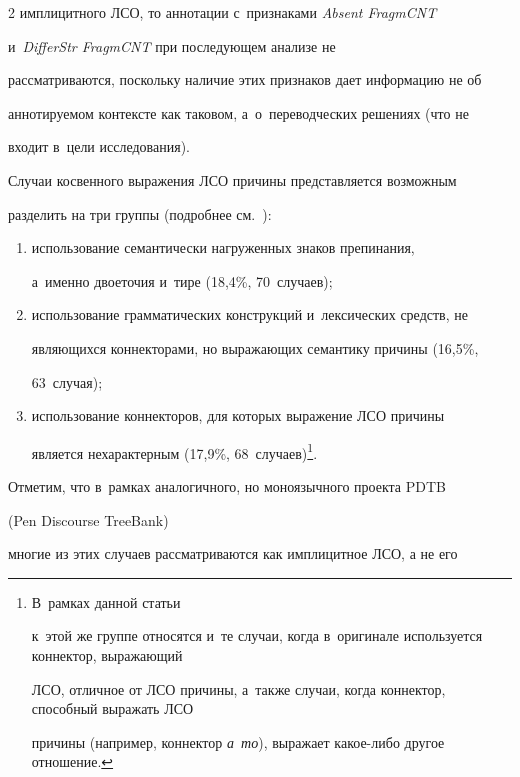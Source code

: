 \begin{multicols}{2}
имплицитного ЛСО, то аннотации с~признаками \textit{Absent FragmCNT} 


и~\textit{DifferStr \mbox{FragmCNT}} при последующем анализе не 


рассматриваются, поскольку наличие этих признаков дает информацию не об 


аннотируемом контексте как таковом, а~о~переводческих решениях (что не 


входит в~цели исследования).


   


   Случаи косвенного выражения ЛСО причины представляется возможным 


разделить на три группы (подробнее см.~\cite{16-in}):


   \begin{enumerate}[(1)]


\item использование семантически нагруженных знаков препинания, 


а~именно двоеточия и~тире (18,4\%, 70~случаев);


\item использование грамматических конструкций и~лексических средств, не 


являющихся коннекторами, но выражающих семантику причины (16,5\%, 


63~случая);


\item использование коннекторов, для которых выражение ЛСО причины 


является нехарактерным (17,9\%, 68~случаев)\footnote{В~рамках данной статьи 


к~этой же группе относятся и~те случаи, когда в~оригинале используется коннектор, выражающий 


ЛСО, отличное от ЛСО причины, а~также случаи, когда коннектор, способный выражать ЛСО 


причины (например, коннектор \textit{а~то}), выражает ка\-кое-ли\-бо другое отношение.}.


\end{enumerate}





   Отметим, что в~рамках аналогичного, но моноязычного проекта PDTB 


   (Pen Discourse TreeBank)


многие из этих случаев рассматриваются как имплицитное ЛСО, а не его 



\end{multicols}
